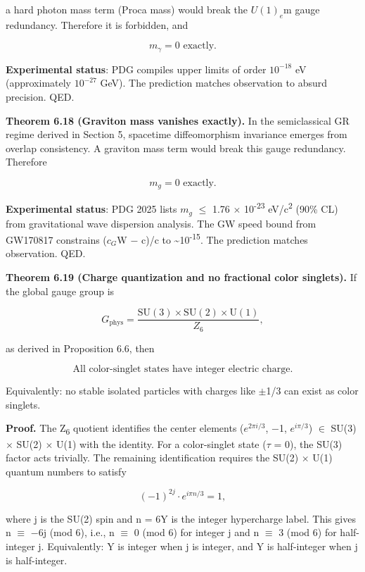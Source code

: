 \documentclass[11pt,a4paper]{article}
\theoremstyle{remark}
\begin{document}
a hard photon mass term (Proca mass) would break the \(U(1)_e\)m gauge
redundancy. Therefore it is forbidden, and

\[
m_\gamma = 0 \text{ exactly.}
\]

\textbf{Experimental status}: PDG compiles upper limits of order \(10^{-18}\) eV
(approximately \(10^{-27}\) GeV). The prediction matches observation to absurd
precision. QED.

\textbf{Theorem 6.18 (Graviton mass vanishes exactly).} In the semiclassical GR
regime derived in Section 5, spacetime diffeomorphism invariance emerges
from overlap consistency. A graviton mass term would break this gauge
redundancy. Therefore

\[
m_g = 0 \text{ exactly.}
\]

\textbf{Experimental status}: PDG 2025 lists \(m_g\) \ensuremath{\leq} 1.76 \ensuremath{\times} 10\textsuperscript{-23}
eV/c\textsuperscript{2} (90\% CL) from gravitational wave dispersion analysis. The GW speed
bound from GW170817 constrains (\(c_G\)W \ensuremath{-} c)/c to \textasciitilde10\textsuperscript{-15}. The
prediction matches observation. QED.

\textbf{Theorem 6.19 (Charge quantization and no fractional color singlets).} If
the global gauge group is

\[
G_{\mathrm{phys}} = \frac{\mathrm{SU}(3) \times \mathrm{SU}(2) \times \mathrm{U}(1)}{Z_6},
\]

as derived in Proposition 6.6, then

\[
\text{All color-singlet states have integer electric charge.}
\]

Equivalently: no stable isolated particles with charges like \ensuremath{\pm}1/3 can
exist as color singlets.

\textbf{Proof.} The Z\textsubscript{6} quotient identifies the center elements
(\(e^{2\ensuremath{\pi}i/3}\), \ensuremath{-}1, \(e^{i\ensuremath{\pi}/3}\)) \ensuremath{\in} SU(3) \ensuremath{\times} SU(2) \ensuremath{\times} U(1)
with the identity. For a color-singlet state (\ensuremath{\tau} = 0), the SU(3) factor acts
trivially. The remaining identification requires the SU(2) \ensuremath{\times} U(1)
quantum numbers to satisfy

\[
(-1)^{2j} \cdot e^{i\pi n/3} = 1,
\]

where j is the SU(2) spin and n = 6Y is the integer hypercharge label.
This gives n \ensuremath{\equiv} \ensuremath{-}6j (mod 6), i.e., n \ensuremath{\equiv} 0 (mod 6) for integer j and
n \ensuremath{\equiv} 3 (mod 6) for half-integer j. Equivalently: Y is integer when j is
integer, and Y is half-integer when j is half-integer.
\end{document}
